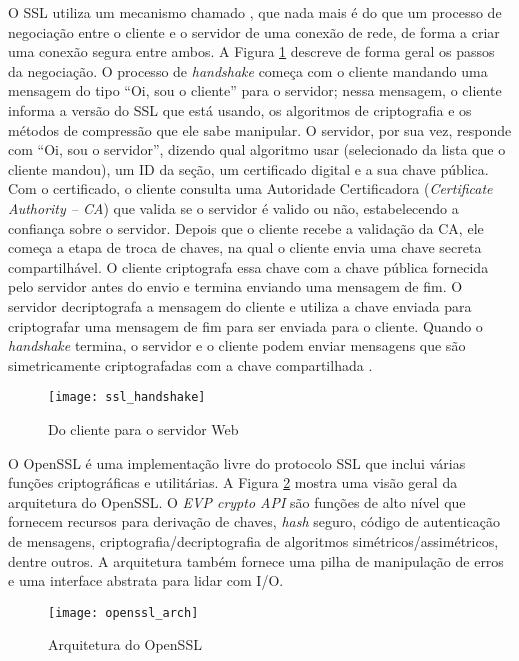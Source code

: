 O SSL utiliza um mecanismo chamado , que
nada mais é do que um processo de negociação entre o cliente e o servidor de uma conexão de rede, de
forma a criar uma conexão segura entre ambos. A Figura
\ref{fig:openssl_handshake} descreve de forma geral os passos da negociação. O
processo de \emph{handshake} começa com o cliente mandando uma mensagem do
tipo ``Oi, sou o cliente'' para o servidor; nessa mensagem, o cliente informa a
versão do SSL que está usando, os algoritmos de criptografia e os métodos de
compressão que ele sabe manipular. O servidor, por sua vez, responde com ``Oi, sou o
servidor'', dizendo qual algoritmo usar (selecionado da lista que o cliente
mandou), um ID da seção, um certificado digital e a sua chave pública. Com o
certificado, o cliente consulta uma Autoridade Certificadora (\emph{Certificate Authority -- CA})
que valida se o servidor é valido ou não,
estabelecendo a confiança sobre o servidor. Depois que o cliente recebe a
validação da CA, ele começa a etapa de troca de chaves, na qual o cliente envia
uma chave secreta compartilhável. O cliente criptografa essa chave com a chave
pública fornecida pelo servidor antes do envio e termina enviando uma mensagem de
fim. O servidor decriptografa a mensagem do cliente e utiliza a chave enviada
para criptografar uma mensagem de fim para ser enviada para o cliente. Quando
o \emph{handshake} termina, o servidor e o cliente podem enviar mensagens que
são simetricamente criptografadas com a chave compartilhada \citep{openssl}.

\begin{figure}[!h]
  \centering
  \texttt{[image: ssl\_handshake]}
  \caption{Do cliente para o servidor Web}
  \label{fig:openssl_handshake}
\end{figure}

O OpenSSL é uma implementação livre do protocolo SSL que
inclui várias funções criptográficas e utilitárias. A Figura
\ref{fig:openssl_arch} mostra uma visão geral da arquitetura do OpenSSL. O
\emph{EVP crypto API} são funções de alto nível que fornecem recursos para
derivação de chaves, \emph{hash} seguro, código de autenticação de mensagens,
criptografia/decriptografia de algoritmos simétricos/assimétricos, dentre outros. A
arquitetura também fornece uma pilha de manipulação de erros e uma interface
abstrata para lidar com I/O.

\begin{figure}[!h]
  \centering
  \texttt{[image: openssl\_arch]}
  \caption[Arquitetura do OpenSSL]{Arquitetura do OpenSSL \citep{crypto_openssl}}
  \label{fig:openssl_arch}
\end{figure}

